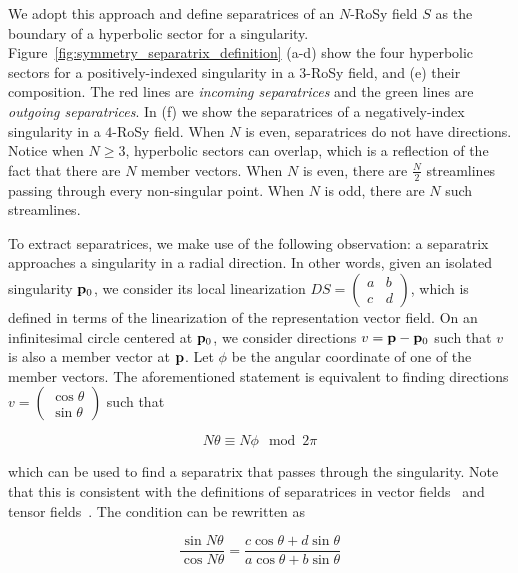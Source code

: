 \documentclass{acmsiggraph}               %
\begin{document}
We adopt this approach and define separatrices of an $N$-RoSy field
$S$ as the boundary of a hyperbolic sector for a singularity.
Figure~\ref{fig:symmetry_separatrix_definition} (a-d) show the four
hyperbolic sectors for a positively-indexed singularity in a
$3$-RoSy field, and (e) their composition. The red lines are {\em
incoming separatrices} and the green lines are {\em outgoing
separatrices}. In (f) we show the separatrices of a negatively-index
singularity in a $4$-RoSy field. When $N$ is even, separatrices do
not have directions. Notice when $N \ge 3$, hyperbolic sectors can
overlap, which is a reflection of the fact that there are $N$ member
vectors. When $N$ is even, there are $\frac{N}{2}$ streamlines
passing through every non-singular point. When $N$ is odd, there are
$N$ such streamlines.

To extract separatrices, we make use of the following observation: a
separatrix approaches a singularity in a radial direction. In other
words, given an isolated singularity ${\bf p}_0$, we consider its
local linearization $DS = \begin{pmatrix} a & b \\ c & d
\end{pmatrix}$, which is defined in terms of the linearization of
the representation vector field. On an infinitesimal circle centered
at ${\bf p}_0$, we consider directions $v = {\bf p} - {\bf p}_0$
such that $v$ is also a member vector at ${\bf p}$. Let $\phi$ be
the angular coordinate of one of the member vectors. The
aforementioned statement is equivalent to finding directions $v =
\begin{pmatrix} \cos\theta \\ \sin\theta \end{pmatrix}$ such
that

\begin{equation}
N\theta \equiv N\phi \mod 2\pi
\end{equation}

\noindent which can be used to find a separatrix that passes through
the singularity. Note that this is consistent with the definitions
of separatrices in vector fields~\cite{Tricoche:02} and tensor
fields~\cite{Delmarcelle:94}. The condition can be rewritten as

\begin{equation}
\frac{\sin N\theta}{\cos N\theta} =
\frac{c\cos\theta+d\sin\theta}{a\cos\theta+b\sin\theta}
\label{eq:sep_computation}
\end{equation}
\end{document}
